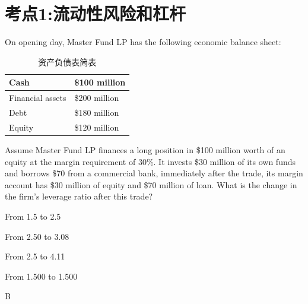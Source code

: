 \documentclass{article}
\newcounter{question} %
\begin{document}
 \tableofcontents %
\newpage





\section{考点1:流动性风险和杠杆}
\setcounter{question}{0}
\begin{question}
    On opening day, Master Fund LP has the following economic balance sheet:

    \begin{table}[htbp]
        \centering
        \begin{tabular}{|l|l|}
            \hline
            Cash              & \$100 million  \\
            \hline
            Financial assets  & \$200 million  \\
            \hline
            Debt              & \$180 million  \\
            \hline
            Equity            & \$120 million  \\
            \hline
        \end{tabular}
        \caption{资产负债表简表}
    \end{table}
    Assume Master Fund LP finances a long position in \$100 million worth of an equity at the margin requirement of 30\%. It invests \$30 million of its own funds and borrows \$70 from a commercial bank, immediately after the trade, its margin account has \$30 million of equity and \$70 million of loan. What is the change in the firm's leverage ratio after this trade?
\end{question}

\begin{choices}
    \item From 1.5 to 2.5
    \item From 2.50 to 3.08
    \item From 2.5 to 4.11
    \item From 1.500 to 1.500
\end{choices}

\begin{correctanswer}
    B
\end{correctanswer}
\end{document}
